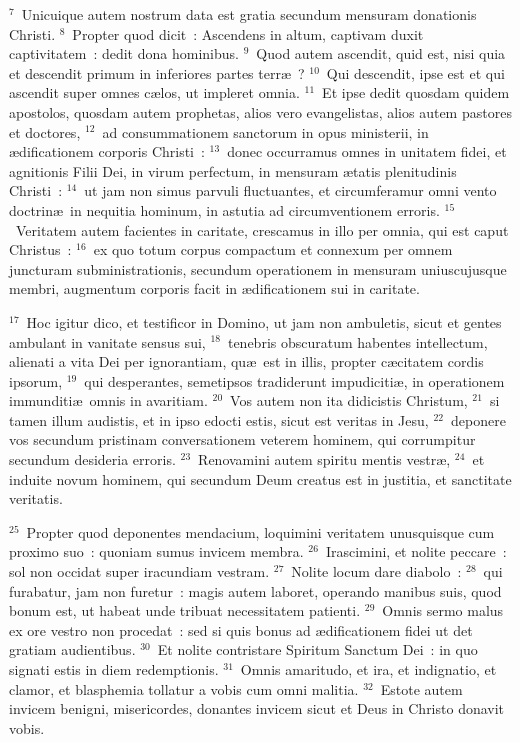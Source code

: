 ${}^{7}$~Unicuique autem nostrum data est gratia secundum mensuram donationis Christi.
${}^{8}$~Propter quod dicit~: Ascendens in altum, captivam duxit captivitatem~: dedit dona hominibus.
${}^{9}$~Quod autem ascendit, quid est, nisi quia et descendit primum in inferiores partes terr\ae~?
${}^{10}$~Qui descendit, ipse est et qui ascendit super omnes c\ae los, ut impleret omnia.
${}^{11}$~Et ipse dedit quosdam quidem apostolos, quosdam autem prophetas, alios vero evangelistas, alios autem pastores et doctores,
${}^{12}$~ad consummationem sanctorum in opus ministerii, in \ae dificationem corporis Christi~:
${}^{13}$~donec occurramus omnes in unitatem fidei, et agnitionis Filii Dei, in virum perfectum, in mensuram \ae tatis plenitudinis Christi~:
${}^{14}$~ut jam non simus parvuli fluctuantes, et circumferamur omni vento doctrin\ae\ in nequitia hominum, in astutia ad circumventionem erroris.
${}^{15}$~Veritatem autem facientes in caritate, crescamus in illo per omnia, qui est caput Christus~:
${}^{16}$~ex quo totum corpus compactum et connexum per omnem juncturam subministrationis, secundum operationem in mensuram uniuscujusque membri, augmentum corporis facit in \ae dificationem sui in caritate.


${}^{17}$~Hoc igitur dico, et testificor in Domino, ut jam non ambuletis, sicut et gentes ambulant in vanitate sensus sui,
${}^{18}$~tenebris obscuratum habentes intellectum, alienati a vita Dei per ignorantiam, qu\ae\ est in illis, propter c\ae citatem cordis ipsorum,
${}^{19}$~qui desperantes, semetipsos tradiderunt impudiciti\ae , in operationem immunditi\ae\ omnis in avaritiam.
${}^{20}$~Vos autem non ita didicistis Christum,
${}^{21}$~si tamen illum audistis, et in ipso edocti estis, sicut est veritas in Jesu,
${}^{22}$~deponere vos secundum pristinam conversationem veterem hominem, qui corrumpitur secundum desideria erroris.
${}^{23}$~Renovamini autem spiritu mentis vestr\ae ,
${}^{24}$~et induite novum hominem, qui secundum Deum creatus est in justitia, et sanctitate veritatis.


${}^{25}$~Propter quod deponentes mendacium, loquimini veritatem unusquisque cum proximo suo~: quoniam sumus invicem membra.
${}^{26}$~Irascimini, et nolite peccare~: sol non occidat super iracundiam vestram.
${}^{27}$~Nolite locum dare diabolo~:
${}^{28}$~qui furabatur, jam non furetur~: magis autem laboret, operando manibus suis, quod bonum est, ut habeat unde tribuat necessitatem patienti.
${}^{29}$~Omnis sermo malus ex ore vestro non procedat~: sed si quis bonus ad \ae dificationem fidei ut det gratiam audientibus.
${}^{30}$~Et nolite contristare Spiritum Sanctum Dei~: in quo signati estis in diem redemptionis.
${}^{31}$~Omnis amaritudo, et ira, et indignatio, et clamor, et blasphemia tollatur a vobis cum omni malitia.
${}^{32}$~Estote autem invicem benigni, misericordes, donantes invicem sicut et Deus in Christo donavit vobis.

